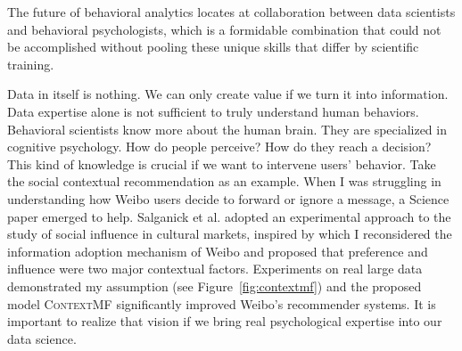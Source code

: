 \documentclass[10.5pt]{article}
\begin{document}
\vskip 0.08in
\vskip 0.01in

The future of behavioral analytics locates at collaboration between data scientists and behavioral psychologists, which is a formidable combination that could not be accomplished without pooling these unique skills that differ by scientific training.

Data in itself is nothing. We can only create value if we turn it into information. Data expertise alone is not sufficient to truly understand human behaviors. Behavioral scientists know more about the human brain. They are specialized in cognitive psychology. How do people perceive? How do they reach a decision? This kind of knowledge is crucial if we want to intervene users' behavior. Take the social contextual recommendation as an example. When I was struggling in understanding how Weibo users decide to forward or ignore a message, a Science paper \cite{salganik2006experimental} emerged to help. Salganick et al. adopted an experimental approach to the study of social influence in cultural markets, inspired by which I reconsidered the information adoption mechanism of Weibo and proposed that preference and influence were two major contextual factors. Experiments on real large data demonstrated my assumption (see Figure~\ref{fig:contextmf}) and the proposed model \textsc{ContextMF} significantly improved Weibo's recommender systems. It is important to realize that vision if we bring real psychological expertise into our data science.
\end{document}
